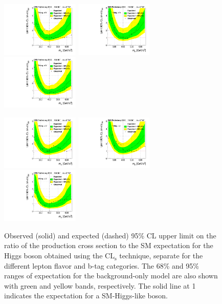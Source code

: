 \begin{figure}[htbp]
 \begin{center}
\centerline{
\includegraphics[width=0.33\textwidth]{plots/limit_observed_0-btag_ee.pdf}
\includegraphics[width=0.33\textwidth]{plots/limit_observed_1-btag_ee.pdf}
\includegraphics[width=0.33\textwidth]{plots/limit_observed_2-btag_ee.pdf}
}
\centerline{
\includegraphics[width=0.33\textwidth]{plots/limit_observed_0-btag_mm.pdf}
\includegraphics[width=0.33\textwidth]{plots/limit_observed_1-btag_mm.pdf}
\includegraphics[width=0.33\textwidth]{plots/limit_observed_2-btag_mm.pdf}
}
\caption{
Observed (solid) and expected (dashed) 95\% CL upper limit on the ratio of the production cross section to the SM expectation for the Higgs boson obtained using the $\mathrm{CL_s}$ technique, separate for the different lepton flavor and b-tag categories. The 68\% and 95\% ranges of expectation for the background-only model are also shown with green and yellow bands, respectively.  The solid line at 1 indicates the expectation for a SM-Higgs-like boson.
}
\label{fig:limit20fb_split}
\end{center}
\end{figure}


